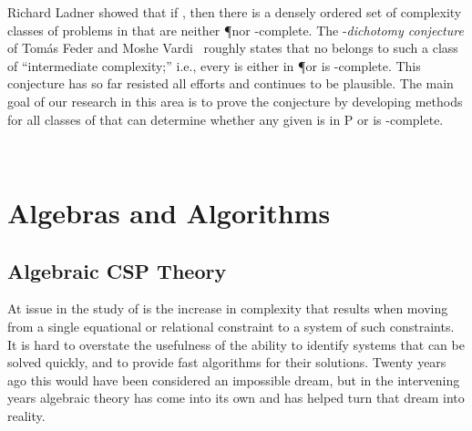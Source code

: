 
\vskip2mm

Richard Ladner \cite{MR0464698} showed that if \PneqNP,
then there is a densely ordered set of complexity classes
of problems in \NP that are neither \P nor \NP-complete.  
The \csp-{\it dichotomy conjecture} of Tom\'as Feder and 
Moshe Vardi~\cite{MR1630445} roughly states that no \csp 
belongs to such a class of ``intermediate complexity;''
i.e., every \csp is either in \P or is \NP-complete.
This conjecture has so far resisted all efforts and continues to be plausible.
The main goal of our research in this area is to prove
the conjecture by developing methods for all classes of \csps
that can determine whether
any given \csp is in P or is \NP-complete. %




~
\vskip5mm

\section{Algebras and Algorithms}

\subsection{Algebraic CSP Theory}
At issue in the study of \csps is the increase in complexity
that results when moving from a single equational or relational constraint
to a system of such constraints. It is hard to overstate the usefulness
of the ability to identify systems that can be solved quickly,
and to provide fast algorithms for their solutions. Twenty years ago
this would have been considered an impossible dream,
but in the intervening years algebraic \csp theory
has come into its own and has helped turn that dream into reality.

